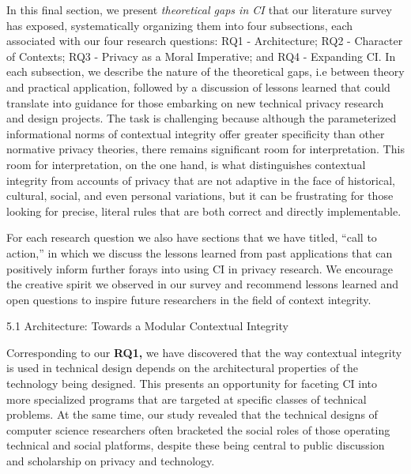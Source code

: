 \documentclass[../thesis.tex]{subfiles}
\begin{document}
\textcolor[rgb]{0.2,0.2,0.2}{In this final section, we present
}\textit{\textcolor[rgb]{0.2,0.2,0.2}{theoretical gaps in CI
}}\textcolor[rgb]{0.2,0.2,0.2}{that our literature survey has exposed,
systematically organizing them into four subsections, each associated
with our four research questions: RQ1 - Architecture; RQ2 - Character
of Contexts; RQ3 - Privacy as a Moral Imperative; and RQ4 - Expanding
CI. In each subsection, we describe the nature of the theoretical gaps,
i.e between theory and practical application, followed by a discussion
of lessons learned that could translate into guidance for those
embarking on new technical privacy research and design projects. The
task is challenging because although the parameterized informational
norms of contextual integrity offer greater specificity than other
normative privacy theories, there remains significant room for
interpretation. This room for interpretation, on the one hand, is what
distinguishes contextual integrity from accounts of privacy that are
not adaptive in the face of historical, cultural, social, and even
personal variations, but it can be frustrating for those looking for
precise, literal rules that are both correct and directly
implementable. }

\textcolor[rgb]{0.2,0.2,0.2}{For each research question we also have
sections that we have titled, ``call to
action,'' in which we discuss the lessons learned
from past applications that can positively inform further forays into
using CI in privacy research. We encourage the creative spirit we
observed in our survey and recommend lessons learned and open questions
to inspire future researchers in the field of context integrity. }

5.1 Architecture: Towards a Modular Contextual Integrity\newline


\textcolor[rgb]{0.2,0.2,0.2}{Corresponding to our
}\textbf{\textcolor[rgb]{0.2,0.2,0.2}{RQ1,}}\textcolor[rgb]{0.2,0.2,0.2}{
we have discovered that the way contextual integrity is used in
technical design depends on the architectural properties of the
technology being designed. This presents an opportunity for faceting CI
into more specialized programs that are targeted at specific classes of
technical problems. At the same time, our study revealed that the
technical designs of computer science researchers often bracketed the
social roles of those operating technical and social platforms, despite
these being central to public discussion and scholarship on privacy and
technology. }
\end{document}
